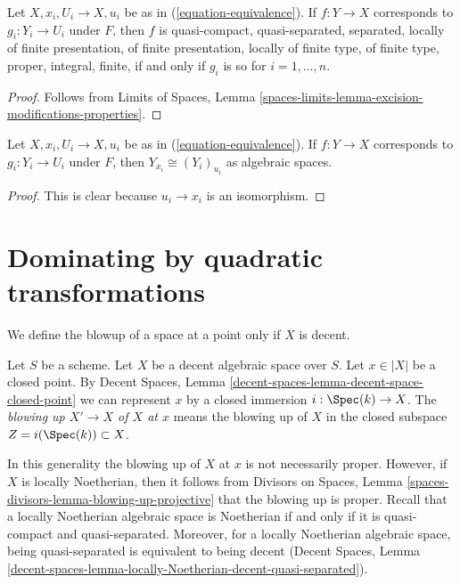 \begin{lemma}
\label{lemma-equivalence-properties}
Let $X, x_i, U_i \to X, u_i$ be as in (\ref{equation-equivalence}).
If $f : Y \to X$ corresponds to $g_i : Y_i \to U_i$ under $F$,
then $f$ is quasi-compact, quasi-separated, separated, locally of finite
presentation, of finite presentation, locally of finite type, of finite type,
proper, integral, finite, if and only if $g_i$ is so
for $i = 1, \ldots, n$.
\end{lemma}

\begin{proof}
Follows from Limits of Spaces, Lemma
\ref{spaces-limits-lemma-excision-modifications-properties}.
\end{proof}

\begin{lemma}
\label{lemma-equivalence-fibre}
Let $X, x_i, U_i \to X, u_i$ be as in (\ref{equation-equivalence}).
If $f : Y \to X$ corresponds to $g_i : Y_i \to U_i$ under $F$,
then $Y_{x_i} \cong (Y_i)_{u_i}$ as algebraic spaces.
\end{lemma}

\begin{proof}
This is clear because $u_i \to x_i$ is an isomorphism.
\end{proof}







\section{Dominating by quadratic transformations}
\label{section-quadratic-spaces}

\noindent
We define the blowup of a space at a point only if $X$ is decent.

\begin{definition}
\label{definition-blowup-at-point}
Let $S$ be a scheme. Let $X$ be a decent algebraic space over $S$.
Let $x \in |X|$ be a closed point. By
Decent Spaces, Lemma \ref{decent-spaces-lemma-decent-space-closed-point}
we can represent $x$ by a closed immersion $i : \Spec(k) \to X$.
The {\it blowing up $X' \to X$ of $X$ at $x$} means the blowing up of $X$
in the closed subspace $Z = i(\Spec(k)) \subset X$.
\end{definition}

\noindent
In this generality the blowing up of $X$ at $x$ is not necessarily proper.
However, if $X$ is locally Noetherian, then it follows from
Divisors on Spaces, Lemma \ref{spaces-divisors-lemma-blowing-up-projective}
that the blowing up is proper.
Recall that a locally Noetherian algebraic space is Noetherian if
and only if it is quasi-compact and quasi-separated. Moreover, for
a locally Noetherian algebraic space, being quasi-separated is
equivalent to being decent (Decent Spaces, Lemma
\ref{decent-spaces-lemma-locally-Noetherian-decent-quasi-separated}).

